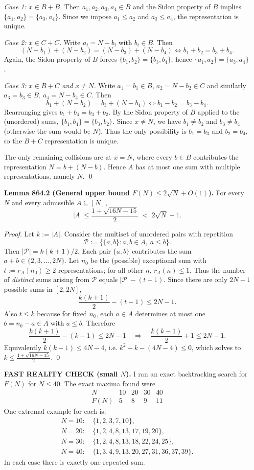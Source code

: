 \emph{Case 1: $x\in B+B$.} Then $a_1,a_2,a_3,a_4\in B$ and the Sidon property of $B$ implies
$\{a_1,a_2\}=\{a_3,a_4\}$.
Since we impose $a_1\le a_2$ and $a_3\le a_4$, the representation is unique.

\emph{Case 2: $x\in C+C$.} Write $a_i=N-b_i$ with $b_i\in B$. Then
\[
(N-b_1)+(N-b_2)=(N-b_3)+(N-b_4)\iff b_1+b_2=b_3+b_4.
\]
Again, the Sidon property of $B$ forces $\{b_1,b_2\}=\{b_3,b_4\}$, hence $\{a_1,a_2\}=\{a_3,a_4\}$.

\emph{Case 3: $x\in B+C$ and $x\ne N$.}
Write $a_1=b_1\in B$, $a_2=N-b_2\in C$ and similarly $a_3=b_3\in B$, $a_4=N-b_4\in C$.
Then
\[
b_1+(N-b_2)=b_3+(N-b_4)\iff b_1-b_2=b_3-b_4.
\]
Rearranging gives $b_1+b_4=b_3+b_2$. By the Sidon property of $B$ applied to the (unordered) sums,
$\{b_1,b_4\}=\{b_3,b_2\}$.
Since $x\ne N$, we have $b_1\ne b_2$ and $b_3\ne b_4$ (otherwise the sum would be $N$).
Thus the only possibility is $b_1=b_3$ and $b_2=b_4$, so the $B+C$ representation is unique.

The only remaining collisions are at $x=N$, where every $b\in B$ contributes the representation $N=b+(N-b)$.
Hence $A$ has at most one sum with multiple representations, namely $N$.
\qed

\medskip
\noindent\textbf{Lemma 864.2 (General upper bound $F(N)\le 2\sqrt N+O(1)$).}
For every $N$ and every admissible $A\subseteq [N]$,
\[
|A|\le \frac{1+\sqrt{16N-15}}{2} \;<\; 2\sqrt N+1.
\]

\smallskip
\noindent\emph{Proof.}
Let $k:=|A|$. Consider the multiset of unordered pairs with repetition
\[
\mathcal{P}:=\{\{a,b\}: a,b\in A,\ a\le b\}.
\]
Then $|\mathcal{P}|=k(k+1)/2$. Each pair $\{a,b\}$ contributes the sum $a+b\in\{2,3,\dots,2N\}$.
Let $n_0$ be the (possible) exceptional sum with $t:=r_A(n_0)\ge 2$ representations; for all other $n$, $r_A(n)\le 1$.
Thus the number of \emph{distinct} sums arising from $\mathcal{P}$ equals $|\mathcal{P}|-(t-1)$.
Since there are only $2N-1$ possible sums in $[2,2N]$,
\[
\frac{k(k+1)}{2}-(t-1)\le 2N-1.
\]
Also $t\le k$ because for fixed $n_0$, each $a\in A$ determines at most one $b=n_0-a\in A$ with $a\le b$.
Therefore
\[
\frac{k(k+1)}{2}-(k-1)\le 2N-1\quad\Longrightarrow\quad \frac{k(k-1)}{2}+1\le 2N-1.
\]
Equivalently $k(k-1)\le 4N-4$, i.e.
$k^2-k-(4N-4)\le 0$, which solves to
$k\le \frac{1+\sqrt{16N-15}}{2}$.
\qed

\medskip
\noindent\textbf{FAST REALITY CHECK (small $N$).}
I ran an exact backtracking search for $F(N)$ for $N\le 40$.
The exact maxima found were
\[
\begin{array}{c|cccc}
N & 10 & 20 & 30 & 40\\\hline
F(N) & 5 & 8 & 9 & 11
\end{array}
\]
One extremal example for each is:
\begin{align*}
N=10:&\ \{1,2,3,7,10\},\\
N=20:&\ \{1,2,4,8,13,17,19,20\},\\
N=30:&\ \{1,2,4,8,13,18,22,24,25\},\\
N=40:&\ \{1,3,4,9,13,20,27,31,36,37,39\}.
\end{align*}
In each case there is exactly one repeated sum.

